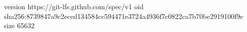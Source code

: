 version https://git-lfs.github.com/spec/v1
oid sha256:8739847a9c2eced134584cc594471e3724a4936f7c0822ca7b70be2919100f9e
size 65632
